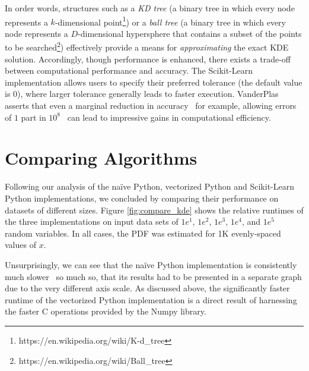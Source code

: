 \documentclass[11pt]{article}
\begin{document}
 \noindent In order words, structures such as a \textit{KD tree} (a binary tree in which every node represents a $k$-dimensional point\footnote{https://en.wikipedia.org/wiki/K-d\_tree}) or a \textit{ball tree} (a binary tree in which every node represents a $D$-dimensional hypersphere that contains a subset of the points to be searched\footnote{https://en.wikipedia.org/wiki/Ball\_tree}) effectively provide a means for \textit{approximating} the exact KDE solution. Accordingly, though performance is enhanced, there exists a trade-off between computational performance and accuracy. The Scikit-Learn implementation allows users to specify their preferred tolerance (the default value is $0$), where larger tolerance generally leads to faster execution. VanderPlas asserts that even a marginal reduction in accuracy \textendash \ for example, allowing errors of $1$ part in $10^8$ \textendash \ can lead to impressive gains in computational efficiency.
 
\section{Comparing Algorithms}

Following our analysis of the na\"ive Python, vectorized Python and Scikit-Learn Python implementations, we concluded by comparing their performance on datasets of different sizes. Figure \ref{fig:compare_kde} shows the relative runtimes of the three implementations on input data sets of $1e^1$, $1e^2$, $1e^3$, $1e^4$, and $1e^5$ random variables. In all cases, the PDF was estimated for 1K evenly-spaced values of $x$. \medskip

\noindent Unsurprisingly, we can see that the na\"ive Python implementation is consistently much slower \textendash \ so much so, that its results had to be presented in a separate graph due to the very different axis scale. As discussed above, the significantly faster runtime of the vectorized Python implementation is a direct result of harnessing the faster C operations provided by the Numpy library.

\newpage
\end{document}
